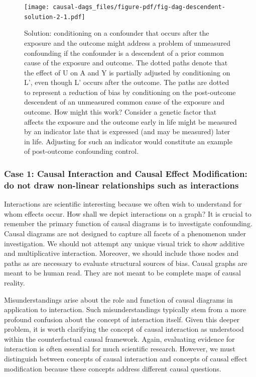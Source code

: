 \documentclass[
  singlecolumn]{article}
\begin{document}
\begin{figure}

{\centering \texttt{[image: causal-dags\_files/figure-pdf/fig-dag-descendent-solution-2-1.pdf]}

}

\caption{\label{fig-dag-descendent-solution-2}Solution: conditioning on
a confounder that occurs after the exposure and the outcome might
address a problem of unmeasured confounding if the confounder is a
descendent of a prior common cause of the exposure and outcome. The
dotted paths denote that the effect of U on A and Y is partially
adjusted by conditioning on L', even though L' occurs after the outcome.
The paths are dotted to represent a reduction of bias by conditioning on
the post-outcome descendent of an unmeasured common cause of the
exposure and outcome. How might this work? Consider a genetic factor
that affects the exposure and the outcome early in life might be
measured by an indicator late that is expressed (and may be measured)
later in life. Adjusting for such an indicator would constitute an
example of post-outcome confounding control.}

\end{figure}

\hypertarget{case-1-causal-interaction-and-causal-effect-modification-do-not-draw-non-linear-relationships-such-as-interactions}{%
\subsubsection{Case 1: Causal Interaction and Causal Effect
Modification: do not draw non-linear relationships such as
interactions}\label{case-1-causal-interaction-and-causal-effect-modification-do-not-draw-non-linear-relationships-such-as-interactions}}

Interactions are scientific interesting because we often wish to
understand for whom effects occur. How shall we depict interactions on a
graph? It is crucial to remember the primary function of causal diagrams
is to investigate confounding. Causal diagrams are not designed to
capture all facets of a phenomenon under investigation. We should not
attempt any unique visual trick to show additive and multiplicative
interaction. Moreover, we should include those nodes and paths as are
necessary to evaluate structural sources of bias. Causal graphs are
meant to be human read. They are not meant to be complete maps of causal
reality.

Misunderstandings arise about the role and function of causal diagrams
in application to interaction. Such misunderstandings typically stem
from a more profound confusion about the concept of interaction itself.
Given this deeper problem, it is worth clarifying the concept of causal
interaction as understood within the counterfactual causal framework.
Again, evaluating evidence for interaction is often essential for much
scientific research. However, we must distinguish between concepts of
causal interaction and concepts of causal effect modification because
these concepts address different causal questions.
\end{document}
